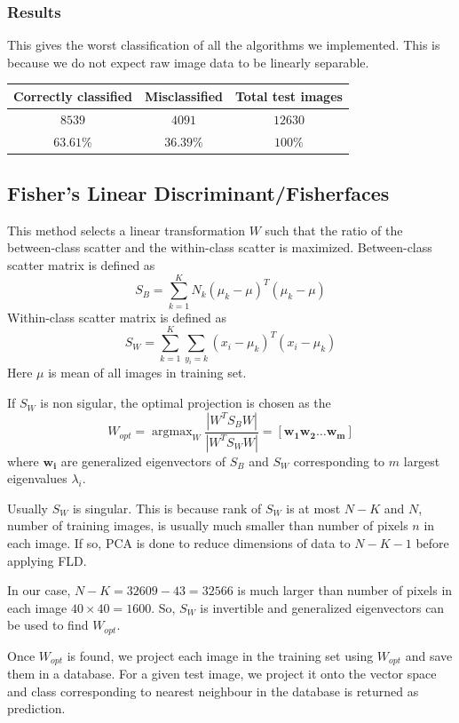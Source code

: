 \documentclass[a4paper]{article}
\newcommand{\argmax}{\operatorname{argmax}}
\begin{document}
\subsubsection{Results}
This gives the worst classification of all the algorithms we implemented. This is because we do not expect raw image data to be linearly separable.
\begin{center}
\begin{tabular}{ |c|c|c| } 
 \hline
 Correctly classified & Misclassified & Total test images \\ 
 \hline
 $8539$ & $4091$ & $12630$ \\ 
 \hline
 $63.61 \%$ & $36.39 \%$ & $100 \%$ \\ 
 \hline
\end{tabular}
\end{center}

\subsection{Fisher's Linear Discriminant/Fisherfaces \cite{fischerfaces}}
This method selects a linear transformation $W$ such that the ratio of the between-class scatter and the within-class scatter is maximized. Between-class scatter matrix is defined as 
\[
S_B = \sum_{k=1}^{K} N_k(\mu_k - \mu)^T(\mu_k - \mu)
\]
Within-class scatter matrix is defined as 
\[
S_W = \sum_{k=1}^{K} \sum_{y_i = k}(x_i - \mu_k )^T(x_i - \mu_k)
\]
Here $\mu$ is mean of all images in training set.

If $S_W$ is non sigular, the optimal projection is chosen as the
\[
W_{opt} = \argmax_W \frac{|W^TS_BW|}{|W^TS_WW|} = [\mathbf{w_1} \mathbf{w_2} \dots \mathbf{w_m}]
\]
where $\mathbf{w_i}$ are generalized eigenvectors of $S_B$ and $S_W$ corresponding to $m$ largest eigenvalues $\lambda_i$.

Usually $S_W$ is singular. This is because rank of $S_W$ is at most $N-K$ and $N$, number of training images, is usually much smaller than number of pixels $n$ in each image. If so, PCA is done to reduce dimensions of data to $N-K-1$ before applying FLD.

In our case, $N - K = 32609 - 43 = 32566$ is much larger than number of pixels in each image $40\times 40 = 1600$. So, $S_W$ is invertible and generalized eigenvectors can be used to find $W_{opt}$.


Once $W_{opt}$ is found, we project each image in the training set using $W_{opt}$ and save them in a database. For a given test image, we project it onto the vector space and class corresponding to nearest neighbour in the database is returned as prediction.
\end{document}
